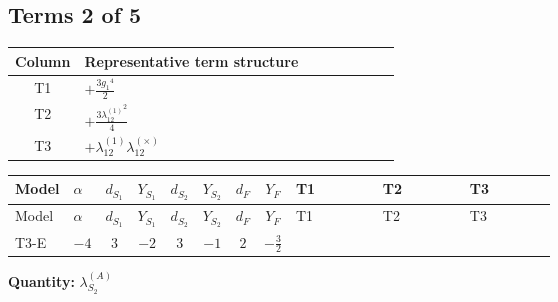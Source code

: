 \documentclass[8pt]{article}
\begin{document}
\begin{landscape}
\subsection*{Terms 2 of 5}
\begin{center}
\begin{tabular}{@{}c >{\raggedright\arraybackslash}p{0.82\linewidth}@{}}
\toprule
Column & Representative term structure \\
\midrule
T1 & \(\displaystyle +\frac{3 {g_1}^4}{2}\) \\
\midrule
T2 & \(\displaystyle +\frac{3 {\lambda_{12}^{(1)}}^2}{4}\) \\
\midrule
T3 & \(\displaystyle +{\lambda_{12}^{(1)}} {\lambda_{12}^{(\times)}}\) \\
\midrule
\bottomrule
\end{tabular}
\end{center}
\smallskip
\tiny
\begin{longtable}{@{}llcccccc >{\raggedright\arraybackslash}p{0.21\linewidth} >{\raggedright\arraybackslash}p{0.21\linewidth} >{\raggedright\arraybackslash}p{0.21\linewidth}@{}}
\toprule
Model & $\alpha$ & $d_{S_1}$ & $Y_{S_1}$ & $d_{S_2}$ & $Y_{S_2}$ & $d_F$ & $Y_F$ & T1 & T2 & T3 \\
\midrule
\endfirsthead
\toprule
Model & $\alpha$ & $d_{S_1}$ & $Y_{S_1}$ & $d_{S_2}$ & $Y_{S_2}$ & $d_F$ & $Y_F$ & T1 & T2 & T3 \\
\midrule
\endhead
T3-E & $-4$ & $3$ & $-2$ & $3$ & $-1$ & $2$ & $-\frac{3}{2}$ & \scriptsize\adjustbox{max width=\linewidth}{$\begin{gathered} +\frac{3 {g_1}^4}{2}\end{gathered}$} & \scriptsize\adjustbox{max width=\linewidth}{$\begin{gathered} +\frac{3 {\lambda_{12}^{(1)}}^2}{4}\end{gathered}$} & \scriptsize\adjustbox{max width=\linewidth}{$\begin{gathered} +{\lambda_{12}^{(1)}} {\lambda_{12}^{(\times)}}\end{gathered}$} \\
\midrule
\bottomrule
\end{longtable}
\clearpage
\noindent\textbf{Quantity: }$\lambda_{S_2}^{(A)}$\par\smallskip

\end{landscape}
\end{document}
